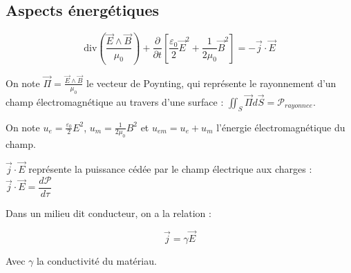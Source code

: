 \documentclass[a4paper,12pt]{book}
\newcommand{\Def}[2]{\begin{tcolorbox}[colback=white,colframe=red!10!green!20!blue!75!, title=Définition : #1]#2\end{tcolorbox}}
\newcommand{\Thr}[2]{\begin{tcolorbox}[sharp corners, colback=white,colframe=red!10!blue!30!green!75!, title=Théorème : #1]#2\end{tcolorbox}}
\newcommand{\Div}{\mathrm{div}}
\renewcommand{\Vec}[1]{\overrightarrow{#1}}
\begin{document}
\subsection{Aspects énergétiques}
\Thr{L'équation locale de Poynting}{
$$\Div\left(\frac{\Vec{E}\wedge\Vec{B}}{\mu_0}\right) + \dfrac{\partial}{\partial t}\left[\frac{\varepsilon_0}{2}\Vec{E}^2+\frac{1}{2\mu_0}\Vec{B}^2\right]=-\Vec{j}\cdot\Vec{E}$$
\par On note $\Vec{\Pi} = \frac{\Vec{E}\wedge\Vec{B}}{\mu_0}$ le vecteur de Poynting, qui représente le rayonnement d'un champ électromagnétique au travers d'une surface : $\iint_S \Vec{\Pi}d\Vec{S} =\mathcal{P}_{rayonnee}$.
\par On note $u_{e} = \frac{\varepsilon_0}{2}E^2$, $u_{m} = \frac{1}{2\mu_0}B^2$ et $u_{em} =u_e+u_m$ l'énergie électromagnétique du champ.
\par $\Vec{j}\cdot\Vec{E}$ représente la puissance cédée par le champ électrique aux charges : $\Vec{j}\cdot\Vec{E} = \dfrac{d\mathcal{P}}{d\tau}$}
\Def{Loi d'Ohm}{Dans un milieu dit conducteur, on a la relation :
\par $$\Vec{j} = \gamma\Vec{E}$$
\par Avec $\gamma$ la conductivité du matériau.}
\end{document}
